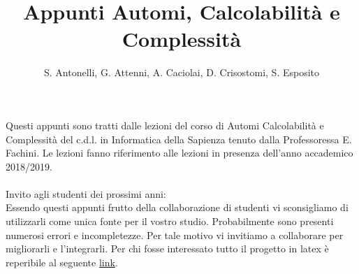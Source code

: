 \documentclass[a4paper,12pt]{article}
\title{Appunti Automi, Calcolabilità e Complessità }
\author{S. Antonelli, G. Attenni, A. Caciolai, D. Crisostomi, S. Esposito}
\begin{document}
\maketitle

\newpage
Questi appunti sono tratti dalle lezioni del corso di Automi Calcolabilità e Complessità del c.d.l. in Informatica della Sapienza tenuto dalla Professoressa E. Fachini. Le lezioni fanno riferimento alle lezioni in presenza dell'anno accademico 2018/2019.\\
\\
Invito agli studenti dei prossimi anni: \\
Essendo questi appunti frutto della collaborazione di studenti vi sconsigliamo di utilizzarli come unica fonte per il vostro studio. Probabilmente sono presenti numerosi errori e incompletezze. Per tale motivo vi invitiamo a collaborare per migliorarli e l'integrarli. Per chi fosse interessato tutto il progetto in latex è reperibile al seguente \href{https://github.com/attennig/appunti_automi.git}{link}.

\newpage

\newpage

\newpage

\newpage

\newpage

\newpage

\newpage

\newpage

\newpage

\newpage

\newpage

\newpage

\newpage

\newpage

\newpage

\newpage

\newpage

\newpage

\newpage

\newpage

\newpage

\end{document}
